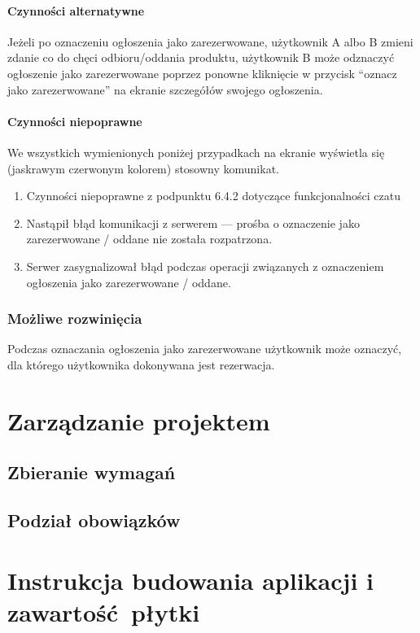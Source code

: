 \documentclass[licencjacka]{pracamgr}
\begin{document}
    \subsubsection{Czynności alternatywne}
    Jeżeli po oznaczeniu ogłoszenia jako zarezerwowane, użytkownik A albo B zmieni zdanie co do chęci odbioru/oddania produktu, użytkownik B może odznaczyć ogłoszenie jako zarezerwowane poprzez ponowne kliknięcie w przycisk ``oznacz jako zarezerwowane'' na ekranie szczegółów swojego ogłoszenia.
    \subsubsection{Czynności niepoprawne}
    We wszystkich wymienionych poniżej przypadkach na ekranie wyświetla się (jaskrawym czerwonym kolorem) stosowny komunikat.
    \begin{enumerate}
        \item Czynności niepoprawne z podpunktu 6.4.2 dotyczące funkcjonalności czatu
        \item Nastąpił błąd komunikacji z serwerem --- prośba o oznaczenie jako zarezerwowane / oddane nie została rozpatrzona.
        \item Serwer zasygnalizował błąd podczas operacji związanych z oznaczeniem ogłoszenia jako zarezerwowane / oddane.
    \end{enumerate}
    \subsection{Możliwe rozwinięcia}
    Podczas oznaczania ogłoszenia jako zarezerwowane użytkownik może oznaczyć, dla którego użytkownika dokonywana jest rezerwacja.

\chapter{Zarządzanie projektem}

\section{Zbieranie wymagań}
\section{Podział obowiązków}

\chapter{Instrukcja budowania aplikacji i zawartość płytki}\label{r:build}
\end{document}
